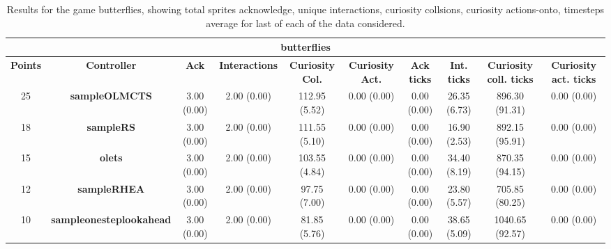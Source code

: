 \begin{table*}[!t]
\begin{center}
\begin{adjustbox}{width=1\textwidth}
\begin{tabular}{|c|c|c|c|c|c|c|c|c|c|}
\multicolumn{10}{c}{\textbf{butterflies}}\\
\hline
\textbf{Points} & \textbf{Controller} & \textbf{Ack} & \textbf{Interactions} & \textbf{Curiosity Col.} & \textbf{Curiosity Act.} & \textbf{Ack ticks} & \textbf{Int. ticks} & \textbf{Curiosity coll. ticks} & \textbf{Curiosity act. ticks}\\
\hline
25 & \textbf{sampleOLMCTS} & 3.00 (0.00) & 2.00 (0.00) & 112.95 (5.52) & 0.00 (0.00) & 0.00 (0.00) & 26.35 (6.73) & 896.30 (91.31) & 0.00 (0.00)
 \\
\hline
18 & \textbf{sampleRS} & 3.00 (0.00) & 2.00 (0.00) & 111.55 (5.10) & 0.00 (0.00) & 0.00 (0.00) & 16.90 (2.53) & 892.15 (95.91) & 0.00 (0.00)
 \\
\hline
15 & \textbf{olets} & 3.00 (0.00) & 2.00 (0.00) & 103.55 (4.84) & 0.00 (0.00) & 0.00 (0.00) & 34.40 (8.19) & 870.35 (94.15) & 0.00 (0.00)
 \\
\hline
12 & \textbf{sampleRHEA} & 3.00 (0.00) & 2.00 (0.00) & 97.75 (7.00) & 0.00 (0.00) & 0.00 (0.00) & 23.80 (5.57) & 705.85 (80.25) & 0.00 (0.00)
 \\
\hline
10 & \textbf{sampleonesteplookahead} & 3.00 (0.00) & 2.00 (0.00) & 81.85 (5.76) & 0.00 (0.00) & 0.00 (0.00) & 38.65 (5.09) & 1040.65 (92.57) & 0.00 (0.00)
 \\
\hline
\end{tabular}
\end{adjustbox}
\caption{Results for the game butterflies, showing total sprites acknowledge, unique interactions, curiosity collsions, curiosity actions-onto, timesteps average for last of each of the data considered.}
\label{tab:weights}
\end{center}
\end{table*}
